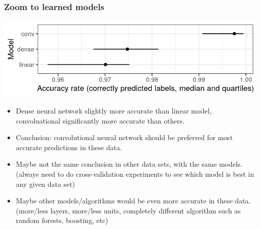 \documentclass{beamer}
\begin{document}
\begin{frame}
  \frametitle{Zoom to learned models}
  \includegraphics[width=\textwidth]{figure-test-accuracy}
  \begin{itemize}
  \item Dense neural network slightly more accurate
    than linear model, convoluational significantly more
    accurate than others.
  \item Conclusion: convolutional neural network should be preferred
    for most accurate predictions in these data.
  \item Maybe not the same conclusion in other data sets, with the
    same models. (always need to do cross-validation experiments to
    see which model is best in any given data set)
  \item Maybe other models/algorithms would be even more accurate in
    these data. (more/less layers, more/less units, completely
    different algorithm such as random forests, boosting, etc)
  \end{itemize}
\end{frame}
 
\end{document}
